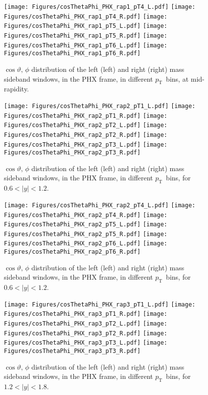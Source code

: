 \documentclass[12pt]{article}
\newcommand{\pt}{$p_{\mathrm{T}}$}
\begin{document}
\begin{figure}[htbp]
\centering
\texttt{[image: Figures/cosThetaPhi\_PHX\_rap1\_pT4\_L.pdf]}
\texttt{[image: Figures/cosThetaPhi\_PHX\_rap1\_pT4\_R.pdf]}
\texttt{[image: Figures/cosThetaPhi\_PHX\_rap1\_pT5\_L.pdf]}
\texttt{[image: Figures/cosThetaPhi\_PHX\_rap1\_pT5\_R.pdf]}
\texttt{[image: Figures/cosThetaPhi\_PHX\_rap1\_pT6\_L.pdf]}
\texttt{[image: Figures/cosThetaPhi\_PHX\_rap1\_pT6\_R.pdf]}
\caption{$\cos\vartheta,\,\phi$ distribution of the left (left) and
  right (right) mass sideband windows, in the PHX frame, in different
  \pt\ bins, at mid-rapidity.} 
\end{figure}
\clearpage


\begin{figure}[htbp]
\centering
\texttt{[image: Figures/cosThetaPhi\_PHX\_rap2\_pT1\_L.pdf]}
\texttt{[image: Figures/cosThetaPhi\_PHX\_rap2\_pT1\_R.pdf]}
\texttt{[image: Figures/cosThetaPhi\_PHX\_rap2\_pT2\_L.pdf]}
\texttt{[image: Figures/cosThetaPhi\_PHX\_rap2\_pT2\_R.pdf]}
\texttt{[image: Figures/cosThetaPhi\_PHX\_rap2\_pT3\_L.pdf]}
\texttt{[image: Figures/cosThetaPhi\_PHX\_rap2\_pT3\_R.pdf]}
\caption{$\cos\vartheta,\,\phi$ distribution of the left (left) and
  right (right) mass sideband windows, in the PHX frame, in different
  \pt\ bins, for $0.6 < |y| < 1.2$.}
\end{figure}
\clearpage

\begin{figure}[htbp]
\centering
\texttt{[image: Figures/cosThetaPhi\_PHX\_rap2\_pT4\_L.pdf]}
\texttt{[image: Figures/cosThetaPhi\_PHX\_rap2\_pT4\_R.pdf]}
\texttt{[image: Figures/cosThetaPhi\_PHX\_rap2\_pT5\_L.pdf]}
\texttt{[image: Figures/cosThetaPhi\_PHX\_rap2\_pT5\_R.pdf]}
\texttt{[image: Figures/cosThetaPhi\_PHX\_rap2\_pT6\_L.pdf]}
\texttt{[image: Figures/cosThetaPhi\_PHX\_rap2\_pT6\_R.pdf]}
\caption{$\cos\vartheta,\,\phi$ distribution of the left (left) and
  right (right) mass sideband windows, in the PHX frame, in different
  \pt\ bins, for $0.6 < |y| < 1.2$.} 
\end{figure}
\clearpage

\begin{figure}[htbp]
\centering
\texttt{[image: Figures/cosThetaPhi\_PHX\_rap3\_pT1\_L.pdf]}
\texttt{[image: Figures/cosThetaPhi\_PHX\_rap3\_pT1\_R.pdf]}
\texttt{[image: Figures/cosThetaPhi\_PHX\_rap3\_pT2\_L.pdf]}
\texttt{[image: Figures/cosThetaPhi\_PHX\_rap3\_pT2\_R.pdf]}
\texttt{[image: Figures/cosThetaPhi\_PHX\_rap3\_pT3\_L.pdf]}
\texttt{[image: Figures/cosThetaPhi\_PHX\_rap3\_pT3\_R.pdf]}
\caption{$\cos\vartheta,\,\phi$ distribution of the left (left) and
  right (right) mass sideband windows, in the PHX frame, in different
  \pt\ bins, for $1.2 < |y| < 1.8$.}
\end{figure}
\clearpage
\end{document}
